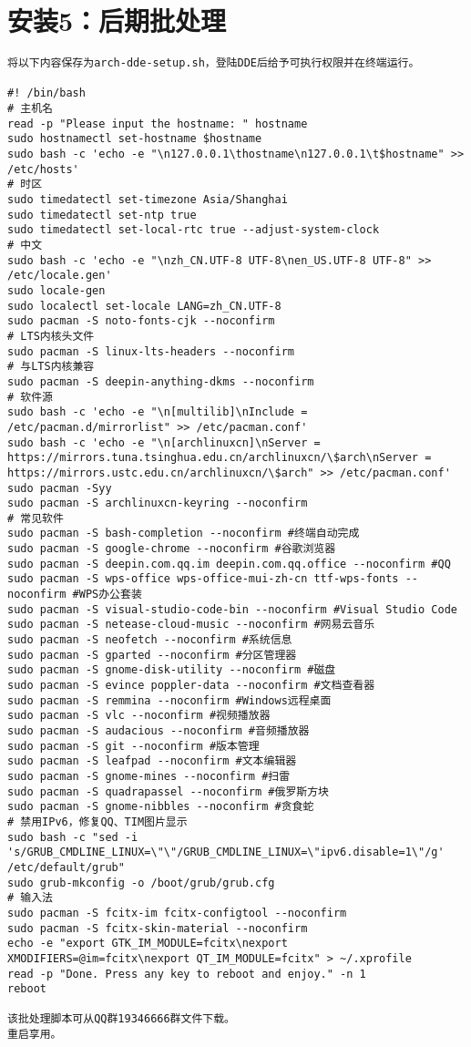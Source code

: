 \documentclass[a4paper,fontset=fandol,zihao=-4,linespread=1.2]{ctexbook}
\begin{document}
\section{安装5：后期批处理}
\begin{lstlisting}
将以下内容保存为arch-dde-setup.sh，登陆DDE后给予可执行权限并在终端运行。

#! /bin/bash
# 主机名
read -p "Please input the hostname: " hostname
sudo hostnamectl set-hostname $hostname
sudo bash -c 'echo -e "\n127.0.0.1\thostname\n127.0.0.1\t$hostname" >> /etc/hosts'
# 时区
sudo timedatectl set-timezone Asia/Shanghai
sudo timedatectl set-ntp true
sudo timedatectl set-local-rtc true --adjust-system-clock
# 中文
sudo bash -c 'echo -e "\nzh_CN.UTF-8 UTF-8\nen_US.UTF-8 UTF-8" >> /etc/locale.gen'
sudo locale-gen
sudo localectl set-locale LANG=zh_CN.UTF-8
sudo pacman -S noto-fonts-cjk --noconfirm
# LTS内核头文件
sudo pacman -S linux-lts-headers --noconfirm
# 与LTS内核兼容
sudo pacman -S deepin-anything-dkms --noconfirm
# 软件源
sudo bash -c 'echo -e "\n[multilib]\nInclude = /etc/pacman.d/mirrorlist" >> /etc/pacman.conf'
sudo bash -c 'echo -e "\n[archlinuxcn]\nServer = https://mirrors.tuna.tsinghua.edu.cn/archlinuxcn/\$arch\nServer = https://mirrors.ustc.edu.cn/archlinuxcn/\$arch" >> /etc/pacman.conf'
sudo pacman -Syy
sudo pacman -S archlinuxcn-keyring --noconfirm
# 常见软件
sudo pacman -S bash-completion --noconfirm #终端自动完成
sudo pacman -S google-chrome --noconfirm #谷歌浏览器
sudo pacman -S deepin.com.qq.im deepin.com.qq.office --noconfirm #QQ
sudo pacman -S wps-office wps-office-mui-zh-cn ttf-wps-fonts --noconfirm #WPS办公套装
sudo pacman -S visual-studio-code-bin --noconfirm #Visual Studio Code
sudo pacman -S netease-cloud-music --noconfirm #网易云音乐
sudo pacman -S neofetch --noconfirm #系统信息
sudo pacman -S gparted --noconfirm #分区管理器
sudo pacman -S gnome-disk-utility --noconfirm #磁盘
sudo pacman -S evince poppler-data --noconfirm #文档查看器
sudo pacman -S remmina --noconfirm #Windows远程桌面
sudo pacman -S vlc --noconfirm #视频播放器
sudo pacman -S audacious --noconfirm #音频播放器
sudo pacman -S git --noconfirm #版本管理
sudo pacman -S leafpad --noconfirm #文本编辑器
sudo pacman -S gnome-mines --noconfirm #扫雷
sudo pacman -S quadrapassel --noconfirm #俄罗斯方块
sudo pacman -S gnome-nibbles --noconfirm #贪食蛇
# 禁用IPv6，修复QQ、TIM图片显示
sudo bash -c "sed -i 's/GRUB_CMDLINE_LINUX=\"\"/GRUB_CMDLINE_LINUX=\"ipv6.disable=1\"/g' /etc/default/grub"
sudo grub-mkconfig -o /boot/grub/grub.cfg
# 输入法
sudo pacman -S fcitx-im fcitx-configtool --noconfirm
sudo pacman -S fcitx-skin-material --noconfirm
echo -e "export GTK_IM_MODULE=fcitx\nexport XMODIFIERS=@im=fcitx\nexport QT_IM_MODULE=fcitx" > ~/.xprofile
read -p "Done. Press any key to reboot and enjoy." -n 1
reboot

该批处理脚本可从QQ群19346666群文件下载。
重启享用。
\end{lstlisting}
\end{document}
